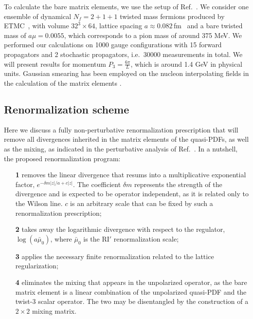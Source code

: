 \documentclass[12pt,tighten,nofootinbib,amssymb,floatfix]{article}
\begin{document}
\medskip
To calculate the bare matrix elements, we use the setup of Ref.~\cite{Alexandrou:2016jqi}.
We consider one ensemble of dynamical $N_f{=}2{+}1{+}1$ twisted mass fermions produced by ETMC~\cite{Baron:2010bv}, with volume 
$32^3 {\times} 64$, lattice spacing $a {\approx}0.082$\,fm~\cite{Carrasco:2014cwa} and a bare twisted mass of $a\mu {=} 0.0055$, 
which corresponds to a pion mass of around 375 MeV. We performed our calculations on 1000 gauge configurations with 15 
forward propagators and 2 stochastic propagators, i.e.\ 30000 measurements in total. We will present results for momentum $P_3=\frac{6\pi}{L}$,
which is around 1.4 GeV in physical units. Gaussian smearing has been employed on the nucleon interpolating fields in the calculation of the matrix elements
\cite{Alexandrou:2016jqi}.

\vspace*{0.25cm}
\subsection{Renormalization scheme}
\label{sec:scheme}
\vspace*{0.15cm}

Here we discuss a fully non-perturbative renormalization prescription that will remove all divergences inherited in the matrix elements 
of the quasi-PDFs, as well as the mixing, as indicated in the perturbative analysis of Ref.~\cite{Constantinou:2017sej}. In a nutshell, the proposed renormalization program: 
\begin{itemize}
\item[\bf 1] removes the linear divergence that resums into a multiplicative exponential factor, 
$e^{-\delta m |z|/a + c |z|}$. The coefficient $\delta m$ represents the strength of the divergence and is 
expected to be operator independent, as it is related only to the Wilson line. $c$ is an arbitrary scale
\cite{Sommer:2015hea} that can be fixed by such a renormalization prescription;
\item[\bf 2] takes away the logarithmic divergence with respect to the regulator, $\log(a\bar\mu_0)$, where $\bar\mu_0$ is 
the RI$'$ renormalization scale;
\item[\bf 3] applies the necessary finite renormalization related to the lattice regularization;
\item[\bf 4] eliminates the mixing that appears in the unpolarized operator, as the bare matrix element is
a linear combination of the unpolarized quasi-PDF and the twist-3 scalar operator. The two may be disentangled by
the construction of a $2{\times}2$ mixing matrix.
\end{itemize}
\end{document}

